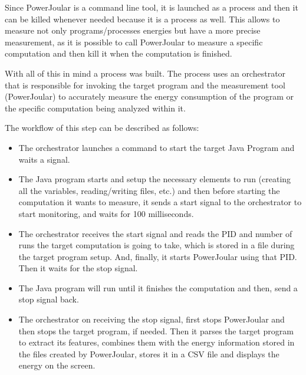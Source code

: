 Since PowerJoular is a command line tool, it is launched as a process and then it can be killed whenever needed because it is a process as well. This allows to measure not only programs/processes energies but have a more precise measurement, as it is possible to call PowerJoular to measure a specific computation and then kill it when the computation is finished.

With all of this in mind a process was built. The process uses an orchestrator that is responsible for invoking the target program and the measurement tool (PowerJoular) to accurately measure the energy consumption of the program or the specific computation being analyzed within it.


The workflow of this step can be described as follows:

\begin{itemize}
  \item The orchestrator launches a command to start the target Java Program and waits a signal.
  \item The Java program starts and setup the necessary elements to run (creating all the variables, reading/writing files, etc.) and then before starting the computation it wants to measure, it sends a start signal to the orchestrator to start monitoring, and waits for 100 milliseconds.
  \item The orchestrator receives the start signal and reads the PID and number of runs the target computation is going to take, which is stored in a file during the target program setup. And, finally, it starts PowerJoular using that PID. Then it waits for the stop signal.
  \item The Java program will run until it finishes the computation and then, send a stop signal back.
  \item The orchestrator on receiving the stop signal, first stops PowerJoular and then stops the target program, if needed. Then it parses the target program to extract its features, combines them with the energy information stored in the files created by PowerJoular, stores it in a CSV file and displays the energy on the screen.
\end{itemize}



